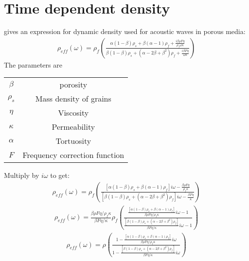 \documentclass[11pt]{article}
\begin{document}
\section*{Time dependent density}
\cite{Williams2001} gives an expression for dynamic density used for
acoustic waves in porous media:
\begin{eqnarray}
  \rho_{eff}(\omega) = 
\rho_f \left( 
              \frac{\alpha(1-\beta)\rho_s + \beta(\alpha-1)\rho_f 
                    + \frac{i \beta\rho F \eta}{\rho_f\omega\kappa}
              }
              {\beta(1-\beta)\rho_s + (\alpha -2\beta+\beta^2)\rho_f
                    + \frac{i \beta F \eta}{\omega\kappa}
              }
       \right)
\end{eqnarray}
The parameters are
\begin{center}
\begin{tabular}{ c c }
 $\beta$    & porosity                       \\ 
 $\rho_s$   & Mass density of grains         \\  
 $\eta$     & Viscosity                      \\
 $\kappa$   & Permeability                   \\
 $\alpha$   & Tortuosity                     \\
 $F$        & Frequency correction function
\end{tabular}
\end{center}

Multiply by $i\omega$ to get:
\begin{eqnarray}
  \rho_{eff}(\omega) = 
\rho_f \left( 
              \frac{[\alpha(1-\beta)\rho_s + \beta(\alpha-1)\rho_f]i\omega 
                    - \frac{\beta\rho F \eta}{\rho_f\kappa}
              }
              {[\beta(1-\beta)\rho_s + (\alpha -2\beta+\beta^2)\rho_f]i\omega
                    - \frac{ \beta F \eta}{\kappa}
              }
       \right)
\end{eqnarray}
\begin{eqnarray}
  \rho_{eff}(\omega) = 
 \frac{\beta\rho F \eta/\rho_f \kappa}{\beta F \eta/ \kappa}
\rho_f \left( 
              \frac{\frac{[\alpha(1-\beta)\rho_s + \beta(\alpha-1)\rho_f]}{\beta\rho F \eta/ \rho_f \kappa}i\omega 
              -1
              }
              {\frac{[\beta(1-\beta)\rho_s + (\alpha -2\beta+\beta^2)\rho_f]}{\beta F \eta/ \kappa} i\omega
              -1}
       \right)
\end{eqnarray}
\begin{eqnarray}
  \rho_{eff}(\omega) = 
\rho \left( 
              \frac{1-\frac{[\alpha(1-\beta)\rho_s + \beta(\alpha-1)\rho_f]}{\beta\rho F \eta/ \rho_f \kappa}i\omega 
              }
              {1-\frac{[\beta(1-\beta)\rho_s + (\alpha -2\beta+\beta^2)\rho_f]}{\beta F \eta/ \kappa} i\omega
              }
       \right)
\end{eqnarray}
\end{document}
